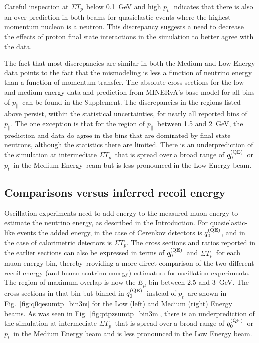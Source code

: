 \documentclass[aps,prl,twocolumn,showpacs,superscriptaddress, floatfix,10pt]{revtex4-2}
\newcommand{\pt}{\ensuremath{p_{t}}}
\newcommand{\pz}{\ensuremath{p_{||}}}
\newcommand{\sumtp}{\ensuremath{\Sigma T_{p}}}
\newcommand{\qzeroqe}{\ensuremath{q_{0}^{\rm\scriptstyle (QE)}}}
\begin{document}
Careful inspection at \sumtp\ below 0.1~GeV and high \pt\  indicates that there is also an over-prediction 
in both beams for quasielastic events where the highest momentum nucleon is a neutron.  
This discrepancy suggests a need to decrease the effects of proton final state interactions in the simulation to better agree with the data. 

The fact that most discrepancies are similar in both the Medium and Low Energy data points to the fact that the mismodeling is less a function of neutrino energy than a function of momentum transfer.  The absolute cross sections for the low and medium energy data and prediction from MINERvA's base model for all bins of \pz\ can be found in the Supplement. 
The discrepancies in the  
regions listed above persist, within the statistical uncertainties, for nearly all reported bins of \pz.   The one exception is that for the region of \pz\ between 1.5 and 2~GeV, the prediction and data do agree in the bins that are dominated by final state neutrons, although the statistics there are limited.  There is an underprediction of the simulation at intermediate \sumtp\ that is spread over a broad range of \qzeroqe\ or \pt\ in the Medium Energy beam but is less pronounced in the Low Energy beam.
%
\subsection{Comparisons versus inferred recoil energy}
Oscillation experiments need to add energy to the measured muon energy to estimate the neutrino energy, as described in the Introduction.  For quasielastic-like events the added energy, in the case of Cerenkov detectors is \qzeroqe, and in the case of calorimetric detectors is \sumtp. The cross sections and ratios reported in the earlier sections can also be expressed in terms of \qzeroqe\ and \sumtp\ for each muon energy bin, thereby providing a more direct comparison of the two different recoil energy (and hence neutrino energy) estimators for oscillation experiments.  The region of maximum overlap is now the $E_\mu$ bin between 2.5 and 3~GeV.  The cross sections in that bin but binned in \qzeroqe\ instead of \pt\ are shown in Fig.~\ref{fig:q0qesumtp_bin3m} for the Low (left) and Medium (right) Energy beams.   As was seen in Fig.~\ref{fig:ptpzsumtp_bin3m}, there is an underprediction of the simulation at intermediate \sumtp\ that is spread over a broad range of \qzeroqe\ or \pt\ in the Medium Energy beam and is less pronounced in the Low Energy beam. 
\end{document}
